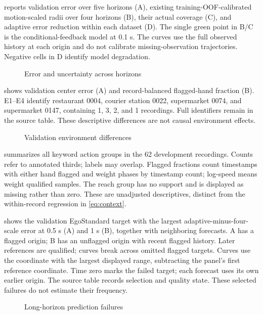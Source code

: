  reports validation error over five horizons (A), existing training-OOF-calibrated motion-scaled radii over four horizons (B), their actual coverage (C), and adaptive error reduction within each dataset (D). The single green point in B/C is the conditional-feedback model at 0.1 s. The curves use the full observed history at each origin and do not calibrate missing-observation trajectories. Negative cells in D identify model degradation.
\begin{figure}[!htbp]
\centering
{}
\caption{Error and uncertainty across horizons}
\label{fig:A9}
\end{figure}
\FloatBarrier

 shows validation center error (A) and record-balanced flagged-hand fraction (B). E1--E4 identify restaurant 0004, courier station 0022, supermarket 0074, and supermarket 0147, containing 1, 3, 2, and 1 recordings. Full identifiers remain in the source table. These descriptive differences are not causal environment effects.
\begin{figure}[!htbp]
\centering
{}
\caption{Validation environment differences}
\label{fig:A10}
\end{figure}

 summarizes all keyword action groups in the 62 development recordings. Counts refer to annotated thirds; labels may overlap. Flagged fractions count timestamps with either hand flagged and weight phases by timestamp count; log-speed means weight qualified samples. The reach group has no support and is displayed as missing rather than zero. These are unadjusted descriptives, distinct from the within-record regression in \eqref{eq:context}.

\FloatBarrier

 shows the validation EgoStandard target with the largest adaptive-minus-four-scale error at 0.5 s (A) and 1 s (B), together with neighboring forecasts. A has a flagged origin; B has an unflagged origin with recent flagged history. Later references are qualified; curves break across omitted flagged targets. Curves use the coordinate with the largest displayed range, subtracting the panel's first reference coordinate. Time zero marks the failed target; each forecast uses its own earlier origin. The source table records selection and quality state. These selected failures do not estimate their frequency.
\begin{figure}[!htbp]
\centering
{}
\caption{Long-horizon prediction failures}
\label{fig:A11}
\end{figure}
\FloatBarrier


